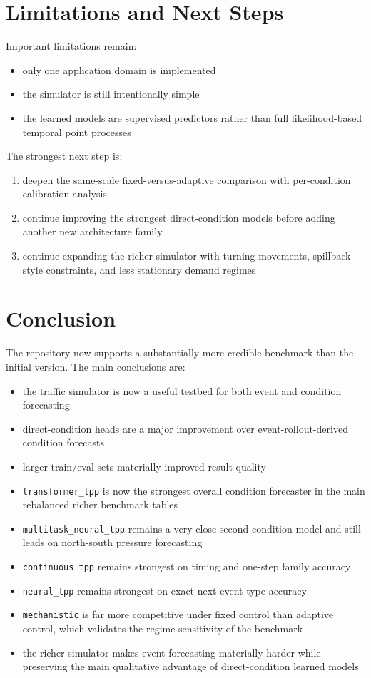 \documentclass[11pt]{article}
\begin{document}
\section{Limitations and Next Steps}

Important limitations remain:
\begin{itemize}
  \item only one application domain is implemented
  \item the simulator is still intentionally simple
  \item the learned models are supervised predictors rather than full likelihood-based temporal point processes
\end{itemize}

The strongest next step is:
\begin{enumerate}
  \item deepen the same-scale fixed-versus-adaptive comparison with per-condition calibration analysis
  \item continue improving the strongest direct-condition models before adding another new architecture family
  \item continue expanding the richer simulator with turning movements, spillback-style constraints, and less stationary demand regimes
\end{enumerate}

\section{Conclusion}

The repository now supports a substantially more credible benchmark than the initial version. The main conclusions are:

\begin{itemize}
  \item the traffic simulator is now a useful testbed for both event and condition forecasting
  \item direct-condition heads are a major improvement over event-rollout-derived condition forecasts
  \item larger train/eval sets materially improved result quality
  \item \texttt{transformer\_tpp} is now the strongest overall condition forecaster in the main rebalanced richer benchmark tables
  \item \texttt{multitask\_neural\_tpp} remains a very close second condition model and still leads on north-south pressure forecasting
  \item \texttt{continuous\_tpp} remains strongest on timing and one-step family accuracy
  \item \texttt{neural\_tpp} remains strongest on exact next-event type accuracy
  \item \texttt{mechanistic} is far more competitive under fixed control than adaptive control, which validates the regime sensitivity of the benchmark
  \item the richer simulator makes event forecasting materially harder while preserving the main qualitative advantage of direct-condition learned models
\end{itemize}
\end{document}
